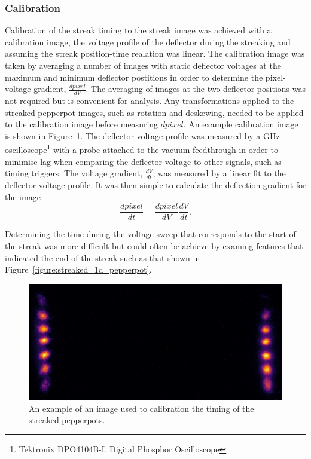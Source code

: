 \subsubsection{Calibration}
Calibration of the streak timing to the streak image was achieved with a calibration image, the voltage profile of the deflector during the streaking and assuming the streak position-time realation was linear.
The calibration image was taken by averaging a number of images with static deflector voltages at the maximum and minimum deflector postitions in order to determine the pixel-voltage gradient, $\frac{dpixel}{dV}$.
The averaging of images at the two deflector positions was not required but is convenient for analysis.
Any transformations applied to the streaked pepperpot images, such as rotation and deskewing, needed to be applied to the calibration image before measuring $dpixel$.
An example calibration image is shown in Figure~\ref{figure:example_calibration}.
The deflector voltage profile was measured by a \unit[1]{GHz} oscilloscope\footnote{Tektronix DPO4104B-L Digital Phosphor Oscilloscope} with a probe attached to the vacuum feedthrough in order to minimise lag when comparing the deflector voltage to other signals, such as timing triggers.
The voltage gradient, $\frac{dV}{dt}$, was measured by a linear fit to the deflector voltage profile.
It was then simple to calculate the  deflection gradient for the image
\begin{equation}
\frac{dpixel}{dt} = \frac{dpixel}{dV} \frac{dV}{dt}.
\end{equation}

Determining the time during the voltage sweep that corresponds to the start of the streak was more difficult but could often be achieve by examing features that indicated the end of the streak such as that shown in Figure~\ref{figure:streaked_1d_pepperpot}.

\begin{figure}
    \center
    \includegraphics[width=0.5\linewidth]{part2/Figs/example_calibration.jpeg}
    \caption{An example of an image used to calibration the timing of the streaked pepperpots.}
    \label{figure:example_calibration}
\end{figure}

